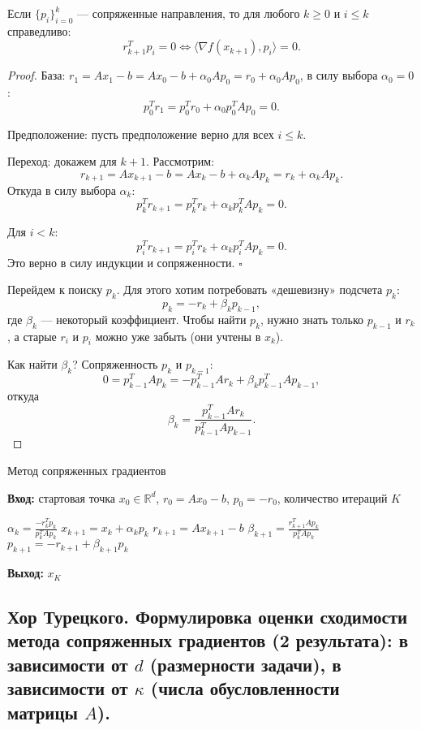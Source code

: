 \begin{theorem}
    Если $\{p_i\}_{i=0}^k$ — сопряженные направления, то для любого $k \geq 0$ и $i \leq k$ справедливо:
    $$ r_{k+1}^T p_i = 0 \Leftrightarrow \langle \nabla f(x_{k+1}), p_i \rangle = 0. $$
\end{theorem}
\begin{proof}
    База: $r_1 = Ax_1 - b = Ax_0 - b + \alpha_0 A p_0 = r_0 + \alpha_0 A p_0$, в силу выбора $\alpha_0 = 0$:
    $$ p_0^T r_1 = p_0^T r_0 + \alpha_0 p_0^T A p_0 = 0. $$

    Предположение: пусть предположение верно для всех $i \leq k$.

    Переход: докажем для $k+1$. Рассмотрим:
    $$ r_{k+1} = Ax_{k+1} - b = Ax_k - b + \alpha_k A p_k = r_k + \alpha_k A p_k. $$
    Откуда в силу выбора $\alpha_k$:
    $$ p_k^T r_{k+1} = p_k^T r_k + \alpha_k p_k^T A p_k = 0. $$

    Для $i < k$:
    $$ p_i^T r_{k+1} = p_i^T r_k + \alpha_k p_i^T A p_k = 0. $$
    Это верно в силу индукции и сопряженности. $\square$

    Перейдем к поиску $p_k$. Для этого хотим потребовать «дешевизну» подсчета $p_k$:
    $$ p_k = -r_k + \beta_k p_{k-1}, $$
    где $\beta_k$ — некоторый коэффициент. Чтобы найти $p_k$, нужно знать только $p_{k-1}$ и $r_k$, а старые $r_i$ и $p_i$ можно уже забыть (они учтены в $x_k$).

    Как найти $\beta_k$? Сопряженность $p_k$ и $p_{k-1}$:
    $$ 0 = p_{k-1}^T A p_k = -p_{k-1}^T A r_k + \beta_k p_{k-1}^T A p_{k-1}, $$
    откуда
    $$ \beta_k = \frac{p_{k-1}^T A r_k}{p_{k-1}^T A p_{k-1}}. $$
\end{proof}

\begin{algorithm}[H]
    \caption{Метод сопряженных градиентов}
    \textbf{Вход:} стартовая точка $x_0 \in \mathbb{R}^d$, $r_0 = A x_0 - b$, $p_0 = -r_0$, количество итераций $K$
    \begin{algorithmic}[1]
        \State $\alpha_k = \frac{-r_k^T p_k}{p_k^T A p_k}$
        \State $x_{k+1} = x_k + \alpha_k p_k$
        \State $r_{k+1} = A x_{k+1} - b$
        \State $\beta_{k+1} = \frac{r_{k+1}^T A p_k}{p_k^T A p_k}$
        \State $p_{k+1} = -r_{k+1} + \beta_{k+1} p_k$
        \EndFor
    \end{algorithmic}
    \textbf{Выход:} $x_K$
\end{algorithm}

\subsection{Хор Турецкого. Формулировка оценки сходимости метода сопряженных градиентов (2 результата):
    в зависимости от \texorpdfstring{$d$}{d} (размерности задачи),
    в зависимости от \texorpdfstring{$\kappa$}{k} (числа обусловленности матрицы \texorpdfstring{$A$}{a}).}

